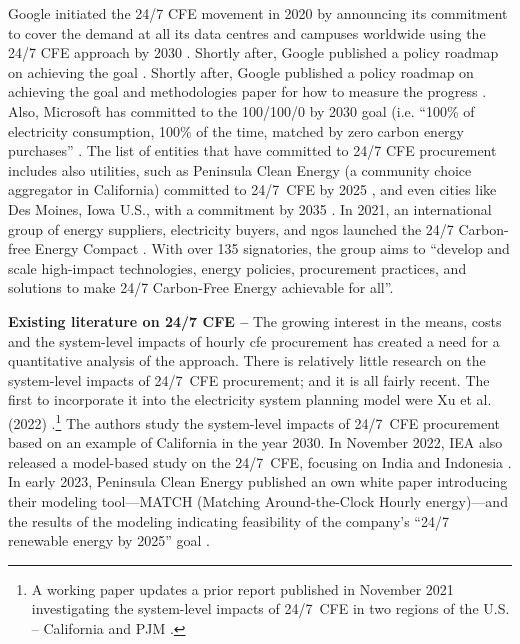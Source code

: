 Google initiated the 24/7 CFE movement in 2020 by announcing its commitment to cover the demand at all its data centres and campuses worldwide using the 24/7 CFE approach by 2030 \cite{google-247by2030}.
Shortly after, Google published a policy roadmap on achieving the goal \cite{google-PolicyRoadmap}.	Shortly after, Google published a policy roadmap on achieving the goal \cite{google-PolicyRoadmap} and methodologies paper for how to measure the progress \cite{google-methodologies}.
Also, Microsoft has committed to the 100/100/0 by 2030 goal (i.e. \enquote{100\% of electricity consumption, 100\% of the time, matched by zero carbon energy purchases} \cite{Microsoft-vision}.
The list of entities that have committed to 24/7 CFE procurement includes also utilities, such as Peninsula Clean Energy (a community choice aggregator in California) committed to 24/7~CFE by 2025 \cite{peninsula-OurPathto247}, and even cities like Des Moines, Iowa U.S., with a commitment by 2035 \cite{iowaenvcouncil-247}. In 2021, an international group of energy suppliers, electricity buyers, and \gls{ngo}s launched the 24/7 Carbon-free Energy Compact \cite{gocarbonfree247}.
With over 135 signatories, the group aims to \enquote{develop and scale high-impact technologies, energy policies, procurement practices, and solutions to make 24/7 Carbon-Free Energy achievable for all}.


\textbf{Existing literature on 24/7 CFE --} The growing interest in the means, costs and the system-level impacts of hourly \gls{cfe} procurement has created a need for a quantitative analysis of the approach.
There is relatively little research on the system-level impacts of 24/7~CFE procurement; and it is all fairly recent.
The first to incorporate it into the electricity system planning model were Xu et al. (2022) \cite{xu-247CFE-SSRN}.\footnote{A working paper updates a prior report published in November 2021 investigating the system-level impacts of 24/7~CFE in two regions of the U.S. -- California and PJM \cite{xu-247CFE-report}.}
The authors study the system-level impacts of 24/7~CFE procurement based on an example of California in the year 2030.
In November 2022, IEA also released a model-based study on the 24/7~CFE, focusing on India and Indonesia \cite{ieaAdvancingDecarbonisationClean2022}.
In early 2023, Peninsula Clean Energy published an own white paper introducing their modeling tool---MATCH (Matching Around-the-Clock Hourly energy)---and the results of the modeling indicating feasibility of the company's \enquote{24/7 renewable energy by 2025} goal \cite{peninsula-report247}.

